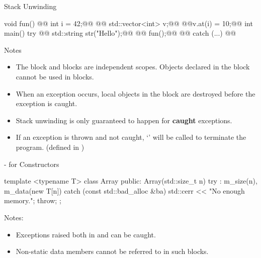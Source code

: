 \documentclass{beamer}
\begin{document}
\begin{frame}[fragile]{Stack Unwinding}
  \begin{cpp}
void fun() {
@@  int i = 42;@@
@@  std::vector<int> v;@@
@@v.at(i) = 10;@@
}
int main() {
  try {
@@    std::string str("Hello");@@
@@    fun();@@
@@  } catch (...) {}@@
}
  \end{cpp}
\end{frame}

\begin{frame}[fragile]{Notes}
  \begin{itemize}
    \item The  block and  blocks are independent scopes. Objects declared in the  block cannot be used in  blocks.
    \item When an exception occurs, local objects in the  block are destroyed before the exception is caught.
    \item Stack unwinding is only guaranteed to happen for \textbf{caught} exceptions.
    \item If an exception is thrown and not caught, `' will be called to terminate the program. (defined in )
  \end{itemize}
\end{frame}

\begin{frame}[fragile]{- for Constructors}
  \begin{cpp}
template <typename T>
class Array {
 public:
  Array(std::size_t n)
      try : m_size(n), m_data(new T[n]{}) {}
  catch (const std::bad_alloc &ba) {
    std::cerr << "No enough memory.\n";
    throw;
  }
};
  \end{cpp}
  Notes:
  \begin{itemize}
    \item Exceptions raised both in  and  can be caught.
    \item Non-static data members cannot be referred to in such  blocks. 
  \end{itemize}
\end{frame}
\end{document}
